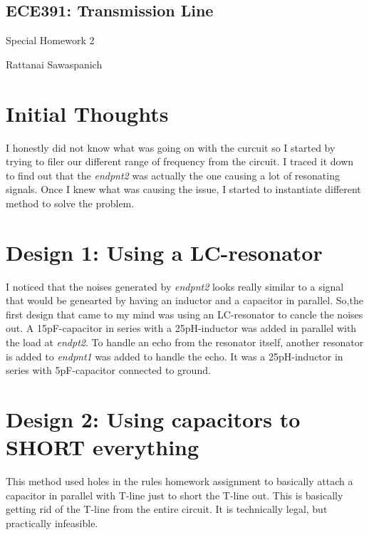 \documentclass[letterpaper,10pt,titlepage,fleqn]{article}
\begin{document}
\pagestyle{empty}

\begin{center}
\section*{ECE391: Transmission Line}
Special Homework 2

Rattanai Sawaspanich
\end{center}

\section*{Initial Thoughts}
I honestly did not know what was going on with the curcuit so I started by 
trying to filer our different range of frequency from the circuit. I traced
it down to find out that the \textit{endpnt2} was actually the one causing 
a lot of resonating signals.  Once I knew what was causing the issue, I started
to instantiate different method to solve the problem. 

\section*{Design 1: Using a LC-resonator}
I noticed that the noises generated by \textit{endpnt2} looks really similar
to a signal that would be genearted by having an inductor and a capacitor in
parallel. So,the first design that came to my mind was using an LC-resonator 
to cancle the noises out. A 15pF-capacitor in series with a 25pH-inductor was
added in parallel with the load at \textit{endpt2}. To handle an echo from the
resonator itself, another resonator is added to \textit{endpnt1} was added
to handle the echo. It was a 25pH-inductor in series with 5pF-capacitor 
connected to ground.

\section*{Design 2: Using capacitors to SHORT everything}
This method used holes in the rules homework assignment to basically attach
a capacitor in parallel with T-line just to short the T-line out. This is
basically getting rid of the T-line from the entire circuit. It is 
technically legal, but practically infeasible. 
\end{document}
